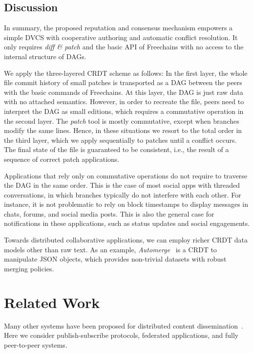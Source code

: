 \documentclass[10pt,journal,compsoc]{IEEEtran}
\newcommand{\FC}       {Freechains\xspace}
\begin{document}
\subsection{Discussion}

In summary, the proposed reputation and consensus mechanism empowers a simple
DVCS with cooperative authoring and automatic conflict resolution.
It only requires \emph{diff \& patch} and the basic API of \FC with no access
to the internal structure of DAGs.

We apply the three-layered CRDT scheme as follows:
In the first layer, the whole file commit history of small patches is
transported as a DAG between the peers with the basic commands of \FC.
At this layer, the DAG is just raw data with no attached semantics.
However, in order to recreate the file, peers need to interpret the DAG as
small editions, which requires a commutative operation in the second layer.
The \emph{patch} tool is mostly commutative, except when branches modify the
same lines.
Hence, in these situations we resort to the total order in the third layer,
which we apply sequentially to patches until a conflict occurs.
The final state of the file is guaranteed to be consistent, i.e., the result of
a sequence of correct patch applications.

Applications that rely only on commutative operations do not require to
traverse the DAG in the same order.
This is the case of most social apps with threaded conversations, in which
branches typically do not interfere with each other.
For instance, it is not problematic to rely on block timestamps to display
messages in chats, forums, and social media posts.
This is also the general case for notifications in these applications, such as
status updates and social engagements.

Towards distributed collaborative applications, we can employ richer CRDT data
models other than raw text.
As an example, \emph{Automerge}~\cite{p2p.automerge} is a CRDT to manipulate
JSON objects, which provides non-trivial datasets with robust merging policies.

\section{Related Work}
\label{sec.related}


Many other systems have been proposed for distributed content
dissemination~\cite{p2p.survey,p2p.ecosystem}.
Here we consider publish-subscribe protocols, federated applications, and fully
peer-to-peer systems.
\end{document}
